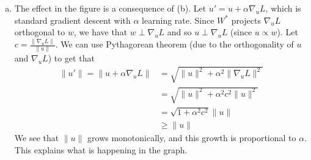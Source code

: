 \documentclass[paper=a4, fontsize=11pt]{scrartcl} %
\numberwithin{equation}{section} %
\numberwithin{figure}{section} %
\numberwithin{table}{section} %
\begin{document}
\begin{enumerate}[(a)]
	\item The effect in the figure is a consequence of (b). Let $u' = u + \alpha\nabla_u L$, which is standard gradient descent with $\alpha$ learning rate. Since $W^*$ projects $\nabla_u L$ orthogonal to $w$, we have that $ w \perp \nabla_u L$ and so $ u \perp \nabla_u L$ (since $u \propto w$). Let $c=\frac{\|\nabla_u L\|}{\|u\|}$. We can use Pythagorean theorem (due to the orthogonality of $u$ and $\nabla_u L$) to get that
	\begin{align*}
	\|u'\| = \| u + \alpha\nabla_u L \| &= \sqrt{\|u\|^2+\alpha^2\|\nabla_u L\|^2}\\
	&= \sqrt{\|u\|^2+\alpha^2c^2\|u\|^2}\\
	&= \sqrt{1+\alpha^2c^2}\|u\|\\
	&\ge \|u\|
	\end{align*}
	We see that $\|u\|$ grows monotonically, and this growth is proportional to $\alpha$. This explains what is happening in the graph.
\end{enumerate}

\newpage



\end{document}
